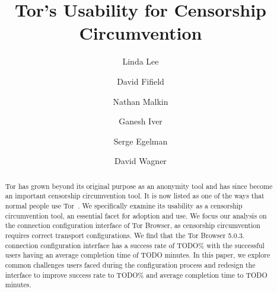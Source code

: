 \documentclass[USenglish,oneside,twocolumn]{article}
\begin{document}
 
  \author*[1]{Linda Lee}

  \author[2]{David Fifield}

  \author[3]{Nathan Malkin}

  \author[4]{Ganesh Iver}

  \author[5]{Serge Egelman}
  
  \author[6]{David Wagner}




  
   

  \title{\huge Tor's Usability for Censorship Circumvention}



  \begin{abstract}
{Tor has grown beyond its original purpose as an anonymity tool and has 
since become an important censorship circumvention tool. It is now listed
as one of the ways that normal people use Tor~\cite{whotor}.
We specifically examine its usability as a censorship circumvention tool,
an essential facet for adoption and use. We focus our analysis on the connection 
configuration interface of Tor Browser, as censorship circumvention requires 
correct transport configurations. We find that the Tor Browser 5.0.3. connection
configuration interface has a success rate of {\color {red} TODO}\% with the 
successful users having an average completion time of {\color {red} TODO} minutes. 
In this paper, we explore common challenges users faced during the configuration
process and redesign the interface to improve success rate to {\color {red} TODO}\% 
and average completion time to {\color {red} TODO} minutes.}
\end{abstract}
\end{document}
